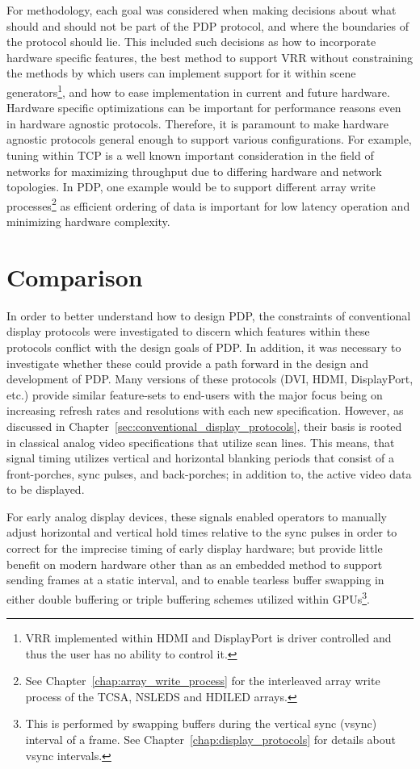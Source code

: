     For methodology, each goal was considered when making decisions about what should and should not be part of the PDP protocol, and where the boundaries of the protocol should lie. This included such decisions as how to incorporate hardware specific features, the best method to support VRR without constraining the methods by which users can implement support for it within scene generators\footnote{VRR implemented within HDMI and DisplayPort is driver controlled and thus the user has no ability to control it.}, and how to ease implementation in current and future hardware. Hardware specific optimizations can be important for performance reasons even in hardware agnostic protocols. Therefore, it is paramount to make hardware agnostic protocols general enough to support various configurations. For example, tuning within TCP\cite{WeigleFeng2002} is a well known important consideration in the field of networks for maximizing throughput due to differing hardware and network topologies. In PDP, one example would be to support different array write processes\footnote{See Chapter~\ref{chap:array_write_process} for the interleaved array write process of the TCSA, NSLEDS and HDILED arrays.} as efficient ordering of data is important for low latency operation and minimizing hardware complexity.

\section{Comparison}

    In order to better understand how to design PDP, the constraints of conventional display protocols were investigated to discern which features within these protocols conflict with the design goals of PDP. In addition, it was necessary to investigate whether these could provide a path forward in the design and development of PDP. Many versions of these protocols (DVI\cite{DDWG1999}, HDMI\cite{HDMIForum2018}, DisplayPort\cite{VESA2016}, etc.) provide similar feature-sets to end-users with the major focus being on increasing refresh rates and resolutions with each new specification. However, as discussed in Chapter~\ref{sec:conventional_display_protocols}, their basis is rooted in classical analog video specifications that utilize scan lines\cite{Neal1998}. This means, that signal timing utilizes vertical and horizontal blanking periods that consist of a front-porches, sync pulses, and back-porches; in addition to, the active video data to be displayed.

    For early analog display devices, these signals enabled operators to manually adjust horizontal and vertical hold times relative to the sync pulses in order to correct for the imprecise timing of early display hardware; but provide little benefit on modern hardware other than as an embedded method to support sending frames at a static interval, and to enable tearless buffer swapping in either double buffering\cite{FriedbergEtAl1990} or triple buffering schemes\cite{3dfx1997} utilized within GPUs\footnote{This is performed by swapping buffers during the vertical sync (vsync) interval of a frame\cite{3dfx1999,3dfx1999_2}. See Chapter~\ref{chap:display_protocols} for details about vsync intervals.}.

